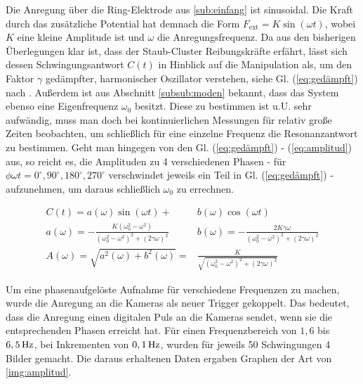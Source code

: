 \documentclass[numbers=noenddot,a4paper]{scrartcl}
\newcommand{\degree}{^\circ}
\newcommand{\ix}[1]{_\text{#1}}
\begin{document}
			Die Anregung über die Ring-Elektrode aus \ref{sub:einfang} ist sinusoidal. Die Kraft durch das zusätzliche Potential hat demnach die Form $F\ix{ext}=K\sin\left(\omega t\right)$, wobei $K$ eine kleine Amplitude ist und $\omega$ die Anregungsfrequenz. Da aus den bisherigen Überlegungen klar ist, dass der Staub-Cluster Reibungskräfte erfährt, lässt sich dessen Schwingungsantwort $C\left(t\right)$ in Hinblick auf die Manipulation als, um den Faktor $\gamma$ gedämpfter, harmonischer Oszillator verstehen, siehe Gl. (\ref{eq:gedämpft}) nach \cite{Carstensen11}. Außerdem ist aus Abschnitt \ref{subsub:moden} bekannt, dass das System ebenso eine Eigenfrequenz $\omega\ix{0}$ besitzt. Diese zu bestimmen ist u.U. sehr aufwändig, muss man doch bei kontinuierlichen Messungen für relativ große Zeiten beobachten, um schließlich für eine einzelne Frequenz die Resonanzantwort zu bestimmen. Geht man hingegen von den Gl. (\ref{eq:gedämpft}) - (\ref{eq:amplitud}) aus, so reicht es, die Amplituden zu 4 verschiedenen Phasen - für $\phi\omega t=0\degree,90\degree,180\degree,270\degree$ verschwindet jeweils ein Teil in Gl. (\ref{eq:gedämpft}) - aufzunehmen, um daraus schließlich $\omega\ix{0}$ zu errechnen.

				\begin{align}
					C\left(t\right)=a\left(\omega\right)\sin\left(\omega t\right)+&b\left(\omega\right)\cos\left(\omega t\right) \label{eq:gedämpft} \\
					a\left(\omega\right)=-\frac{K\left(\omega\ix{0}^2-\omega^2\right)}{\left(\omega\ix{0}^2-\omega^2\right)^2+\left(2\gamma\omega\right)^2} \quad& b\left(\omega\right)=-\frac{2K\gamma\omega}{\left(\omega\ix{0}^2-\omega^2\right)^2+\left(2\gamma\omega\right)^2} \\
					A\left(\omega\right)=\sqrt{a^2\left(\omega\right)+b^2\left(\omega\right)}=&\frac{K}{\sqrt{\left(\omega\ix{0}^2-\omega^2\right)^2+\left(2\gamma\omega\right)^2}} \label{eq:amplitud}
				\end{align}

			Um eine phasenaufgelöste Aufnahme für verschiedene Frequenzen zu machen, wurde die Anregung an die Kameras als neuer Trigger gekoppelt. Das bedeutet, dass die Anregung einen digitalen Puls an die Kameras sendet, wenn sie die entsprechenden Phasen erreicht hat. Für einen Frequenzbereich von $1,6$ bis $\unit[6,5]{Hz}$, bei Inkrementen von $\unit[0,1]{Hz}$, wurden für jeweils 50 Schwingungen 4 Bilder gemacht. Die daraus erhaltenen Daten ergaben Graphen der Art von \ref{img:amplitud}.
\end{document}
